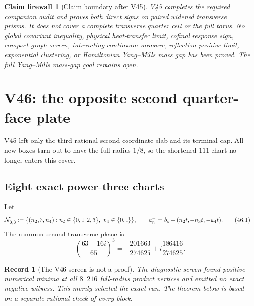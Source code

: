 \documentclass[11pt,oneside]{article}
\newtheorem{firewall}[theorem]{Claim firewall}
\newtheorem{record}[theorem]{Record}
\theoremstyle{definition}
\theoremstyle{remark}
\begin{document}
\begin{firewall}[Claim boundary after V45]
\label{fire:newv45-final}
V45 completes the required companion audit and proves both direct
signs on paired widened transverse prisms.  It does not cover a
complete transverse quarter cell or the full torus.  No global
covariant inequality, physical heat-transfer limit, cofinal
response sign, compact graph-screen, interacting continuum measure,
reflection-positive limit, exponential clustering, or Hamiltonian
Yang--Mills mass gap has been proved.  The full Yang--Mills
mass-gap goal remains open.
\end{firewall}

\section{V46: the opposite second quarter-face plate}
\label{sec:newv46-opposite-second-face}

V45 left only the third rational second-coordinate slab and its
terminal cap.  All new boxes turn out to have the full radius
\(1/8\), so the shortened \(111\) chart no longer enters this
cover.

\subsection{Eight exact power-three charts}

Let
\[
 {\cal N}_{3,3}^{-}:=
 \{(n_2,3,n_4):n_2\in\{0,1,2,3\},\ n_4\in\{0,1\}\},
\qquad
 a_n^-=b_\circ+(n_2t,-n_3t,-n_4t).                   \tag{46.1}
\]
The common second transverse phase is
\[
 -\left(\frac{63-16i}{65}\right)^3
 =-\frac{201663}{274625}+i\frac{186416}{274625}.       \tag{46.2}
\]

\begin{record}[The V46 screen is not a proof]
\label{rec:newv46-screen}
The diagnostic screen found positive numerical minima at all
\(8\cdot216\) full-radius product vertices and emitted no exact
negative witness.  This merely selected the exact run.  The theorem
below is based on a separate rational check of every block.
\end{record}
\end{document}
